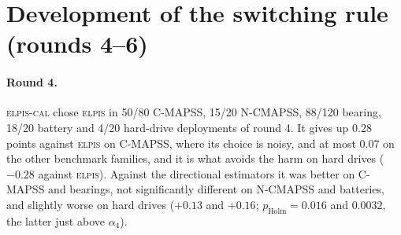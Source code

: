 \documentclass{esannV2}
\newcommand{\RPT}{\textsc{elpis}}
\newcommand{\AUTO}{\textsc{elpis-cal}}
\begin{document}
\FloatBarrier
\section{Development of the switching rule (rounds 4--6)}\label{app:switch}
\paragraph{Round 4.} \AUTO{} chose \RPT{} in 50/80 C-MAPSS, 15/20 N-CMAPSS, 88/120 bearing, 18/20 battery and 4/20 hard-drive deployments of round 4. It gives up 0.28 points against \RPT{} on C-MAPSS, where its choice is noisy, and at most 0.07 on the other benchmark families, and it is what avoids the harm on hard drives ($-0.28$ against \RPT). Against the directional estimators it was better on C-MAPSS and bearings, not significantly different on N-CMAPSS and batteries, and slightly worse on hard drives ($+0.13$ and $+0.16$; $p_{\text{Holm}}=0.016$ and $0.0032$, the latter just above $\alpha_4$).
\end{document}
